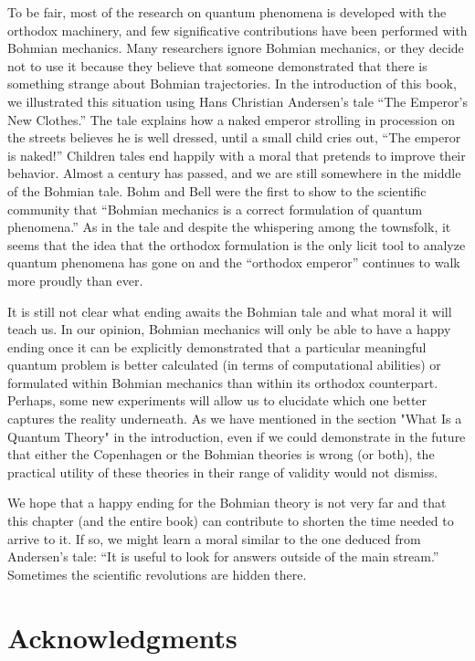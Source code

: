 \documentclass[nofootinbib, secnumarabic, amsmath, nobibnotes,10pt,aps,pra]{revtex4-1}
\begin{document}
To be fair, most of the research on quantum phenomena is developed
with the orthodox machinery, and few significative contributions
have been performed with Bohmian mechanics. Many researchers ignore
Bohmian mechanics, or they decide not to use it because they believe
that someone demonstrated that there is something strange about
Bohmian trajectories. In the introduction of this book, we illustrated
this situation using Hans Christian Andersen's tale ``The Emperor's
New Clothes.'' The tale explains how a naked emperor strolling in
procession on the streets believes he is well dressed, until a small
child cries out, ``The emperor is naked!'' Children tales end
happily with a moral that pretends to improve their behavior. Almost
a century has passed, and we are still somewhere in the middle of
the Bohmian tale. Bohm and Bell were the first to show to the
scientific community that ``Bohmian mechanics is a correct
formulation of quantum phenomena.'' As in the tale and despite the
whispering among the townsfolk, it seems that the idea that the
orthodox formulation is the only licit tool to analyze quantum
phenomena has gone on and the ``orthodox emperor'' continues to walk
more proudly than ever.

It is still not clear what ending awaits the Bohmian tale and what
moral it will teach us. In our opinion, Bohmian mechanics will only
be able to have a happy ending once it can be explicitly
demonstrated that a particular  meaningful quantum problem is better calculated
(in terms of computational abilities) or formulated within Bohmian
mechanics than within its orthodox counterpart. Perhaps, some new experiments will allow us to elucidate which one better captures the reality underneath. 
As we have mentioned in the section "What Is a Quantum Theory" in the introduction, even if we could demonstrate in the future that either the Copenhagen or the Bohmian theories is wrong (or both), the practical utility of these theories in their range of validity would not dismiss. 

We hope that a happy ending for the Bohmian theory is not very far and that this chapter (and the entire book) can contribute to shorten the time needed to arrive to it. If so, we might learn a moral similar to the one deduced from Andersen's tale: ``It is useful to look for answers outside of the main stream.'' Sometimes the scientific revolutions are hidden there.\vspace*{-9pt}\\


\section*{Acknowledgments}
\end{document}
